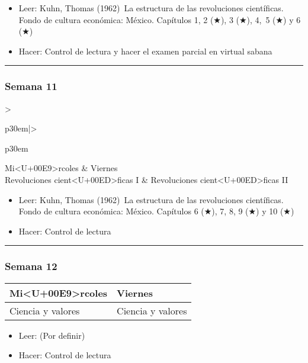 \documentclass[spanish,]{article}
\begin{document}
\begin{itemize}
\item
  Leer: Kuhn, Thomas (1962)~La estructura de las revoluciones
  científicas. Fondo de cultura económica: México. Capítulos 1, 2 (★), 3
  (★), 4,~5 (★) y 6 (★)
\item
  Hacer: Control de lectura y hacer el examen parcial en virtual sabana
\end{itemize}

\begin{center}\rule{0.5\linewidth}{\linethickness}\end{center}

\subsubsection{Semana 11}\label{semana-11}

\begin{tabular}{>{\raggedright\arraybackslash}p{30em}|>{\raggedright\arraybackslash}p{30em}}
\hline
Mi<U+00E9>rcoles & Viernes\\
\hline
Revoluciones cient<U+00ED>ficas I & Revoluciones cient<U+00ED>ficas II\\
\hline
\end{tabular}

\begin{itemize}
\item
  Leer: Kuhn, Thomas (1962)~La estructura de las revoluciones
  científicas. Fondo de cultura económica: México. Capítulos 6 (★), 7,
  8, 9 (★) y 10 (★)
\item
  Hacer: Control de lectura
\end{itemize}

\begin{center}\rule{0.5\linewidth}{\linethickness}\end{center}

\subsubsection{Semana 12}\label{semana-12}

\begin{tabular}{>{\raggedright\arraybackslash}p{30em}|>{\raggedright\arraybackslash}p{30em}}
\hline
Mi<U+00E9>rcoles & Viernes\\
\hline
Ciencia y valores & Ciencia y valores\\
\hline
\end{tabular}

\begin{itemize}
\item
  Leer: (Por definir)
\item
  Hacer: Control de lectura
\end{itemize}
\end{document}
